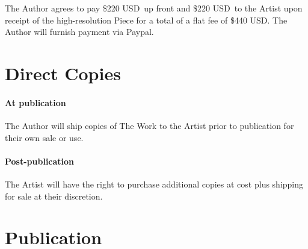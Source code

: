 \documentclass[12pt,letterpaper]{article}
\def\UpFront{\$220 USD}
\def\AtCompletion{\$220 USD}
\def\FlatFee{\$440 USD}
\def\PrintRoyalties{25\%}
\def\DigitalRoyalties{50\%}
\def\PaymentMechanism{Paypal} %
\begin{document}
The Author agrees to pay \UpFront\ up front and \AtCompletion\ to the Artist upon receipt of the high-resolution Piece for a total of a flat fee of \FlatFee. The Author will furnish payment via \PaymentMechanism.

%
%
%
%
%
%
%

\section{Direct Copies}

\paragraph{At publication} The Author will ship copies of The Work to the Artist prior to publication for their own sale or use.

\paragraph{Post-publication} The Artist will have the right to purchase additional copies at cost plus shipping for sale at their discretion.

\section{Publication}
\end{document}

